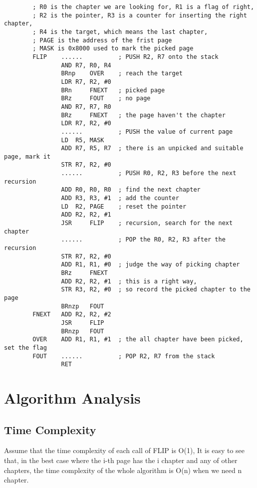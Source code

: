 \documentclass[20pt]{ctexart}
\begin{document}
\begin{verbatim}
        ; R0 is the chapter we are looking for, R1 is a flag of right, 
        ; R2 is the pointer, R3 is a counter for inserting the right chapter,
        ; R4 is the target, which means the last chapter,
        ; PAGE is the address of the frist page
        ; MASK is 0x8000 used to mark the picked page 
        FLIP    ......          ; PUSH R2, R7 onto the stack
                AND R7, R0, R4
                BRnp    OVER    ; reach the target
                LDR R7, R2, #0
                BRn     FNEXT   ; picked page
                BRz     FOUT    ; no page
                AND R7, R7, R0
                BRz     FNEXT   ; the page haven't the chapter
                LDR R7, R2, #0
                ......          ; PUSH the value of current page
                LD  R5, MASK    
                ADD R7, R5, R7  ; there is an unpicked and suitable page, mark it
                STR R7, R2, #0
                ......          ; PUSH R0, R2, R3 before the next recursion
                ADD R0, R0, R0  ; find the next chapter
                ADD R3, R3, #1  ; add the counter
                LD  R2, PAGE    ; reset the pointer 
                ADD R2, R2, #1
                JSR     FLIP    ; recursion, search for the next chapter
                ......          ; POP the R0, R2, R3 after the recursion
                STR R7, R2, #0
                ADD R1, R1, #0  ; judge the way of picking chapter 
                BRz     FNEXT
                ADD R2, R2, #1  ; this is a right way,
                STR R3, R2, #0  ; so record the picked chapter to the page
                BRnzp   FOUT
        FNEXT   ADD R2, R2, #2
                JSR     FLIP
                BRnzp   FOUT
        OVER    ADD R1, R1, #1  ; the all chapter have been picked, set the flag
        FOUT    ......          ; POP R2, R7 from the stack
                RET
        \end{verbatim}

\section{Algorithm Analysis}   

\subsection{Time Complexity}
Assume that the time complexity of each call of FLIP is O(1), It is easy to see that, in the best case where the i-th page has the i chapter and any of other chapters, 
the time complexity of the whole algorithm is O(n) when we need n chapter.
\end{document}
